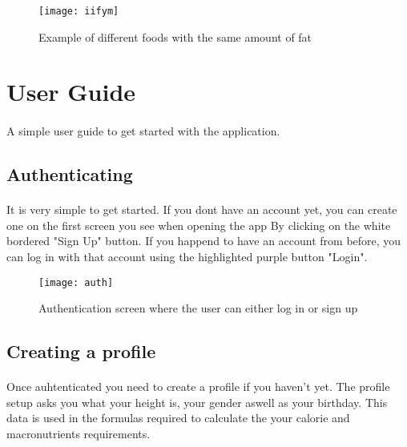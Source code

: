 \documentclass{article}
\begin{document}
    \hfill \break
    \hfill \break

    \begin{figure}[h!]
        \texttt{[image: iifym]}
        \centering
        \caption{Example of different foods with the same amount of fat}
    \end{figure}

\newpage

\section{User Guide}
\paragraph{}
    A simple user guide to get started with the application.

    \hfill \break

\subsection{Authenticating}
\paragraph{}
    It is very simple to get started. If you dont have an account yet, you can create one on the first screen you see when opening the app
    By clicking on the white bordered "Sign Up" button. If you happend to have an account from before, you can log in with that account
    using the highlighted purple button "Login".

    \hfill \break
    \hfill \break
    
    \begin{figure}[h!]
        \texttt{[image: auth]}
        \centering
        \caption{Authentication screen where the user can either log in or sign up}
    \end{figure}
    \newpage

\subsection{Creating a profile}
\paragraph{}
    Once auhtenticated you need to create a profile if you haven't yet. The profile setup asks you what your height is, your gender aswell as your birthday.
    This data is used in the formulas required to calculate the your calorie and macronutrients requirements.
\end{document}
